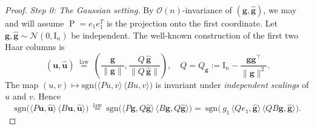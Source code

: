 \documentclass[reqno]{amsart}
\numberwithin{equation}{section}
\newcommand\bg{\bm{g}}
\newcommand\hg{\hat{\bm g}}
\newcommand\bu{\bm{u}}
\newcommand\hu{\hat{\bm u}}
\newcommand\proj{{\operatorname{P}}}
\begin{document}
\begin{proof}
\emph{Step 0: The Gaussian setting.} By $\mathcal{O}(n)$-invariance of $(\bg,\hg)$, we may and will assume $\proj=e_{1}e_{1}^T$ is the projection onto the first coordinate. 
Let $\bg,\hg\sim \mathcal N(0,\mathrm{I}_n)$ be independent. The well-known construction of the first two Haar columns is
\[
(\bu,\hu) \;\stackrel{\mathrm{law}}=\; \left(\frac{\bg}{\|\bg\|}, \frac{Q\,\hg}{\|Q\,\hg\|}\right),
\quad
Q=Q_{\bg}:=\mathrm{I}_n-\frac{\bg\bg^\top}{\|\bg\|^2}.
\]
The map
$(u,v)\mapsto \mathrm{sgn}\big(\langle Pu,v\rangle\,\langle Bu,v\rangle\big)$
is invariant under \emph{independent scalings} of $u$ and $v$.
Hence
\[
\mathrm{sgn}\!\big(\langle P\bu,\hu\rangle\,\langle B\bu,\hu\rangle\big)
\ \stackrel{\mathrm{law}}=\ 
\mathrm{sgn}\!\big(\langle P\bg,Q\hg\rangle\,\langle B\bg,Q\hg\rangle\big)=\ 
\mathrm{sgn}\!\big(\, g_{1}\,\langle Qe_1,\hg\rangle\,\langle QB\bg,\hg\rangle\big).
\]


\end{proof}
\end{document}

